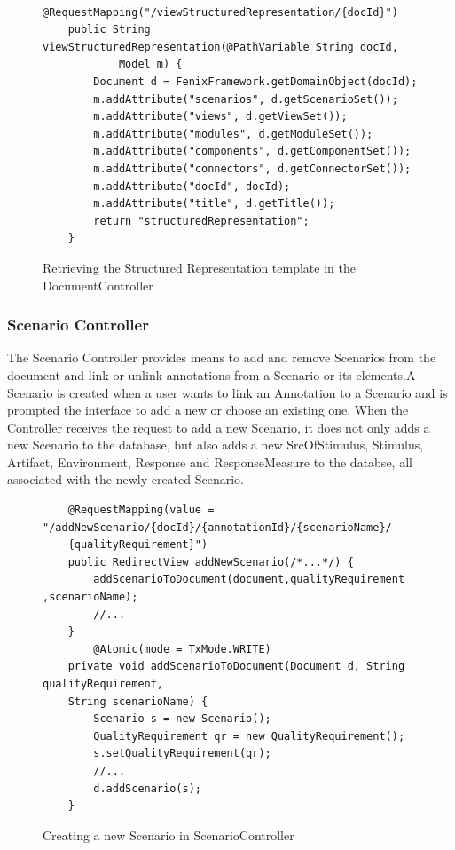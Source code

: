 \documentclass{llncs}
\begin{document}
\begin{itemize}
\begin{figure}
\lstset{style=customjava}
\begin{lstlisting}
	@RequestMapping("/viewStructuredRepresentation/{docId}")
	public String viewStructuredRepresentation(@PathVariable String docId,
			Model m) {
		Document d = FenixFramework.getDomainObject(docId);
		m.addAttribute("scenarios", d.getScenarioSet());
		m.addAttribute("views", d.getViewSet());
		m.addAttribute("modules", d.getModuleSet());
		m.addAttribute("components", d.getComponentSet());
		m.addAttribute("connectors", d.getConnectorSet());
		m.addAttribute("docId", docId);
		m.addAttribute("title", d.getTitle());
		return "structuredRepresentation";
	}
\end{lstlisting}
\caption{Retrieving the Structured Representation template in the DocumentController}
\label{figure:documentControllerStructuredRepresentation}
\end{figure}
\end{itemize}

\subsubsection{Scenario Controller}

The Scenario Controller provides means to add and remove Scenarios from the document and link or unlink annotations from a Scenario or its elements.A Scenario is created when a user wants to link an Annotation to a Scenario and is prompted the interface to add a new or choose an existing one. When the Controller receives the request to add a new Scenario, it does not only adds a new Scenario to the database, but also adds a new SrcOfStimulus, Stimulus, Artifact, Environment, Response and ResponseMeasure to the databse, all associated with the newly created Scenario. 

\begin{figure}
\lstset{style=customjava}
\begin{lstlisting}
	@RequestMapping(value = "/addNewScenario/{docId}/{annotationId}/{scenarioName}/
	{qualityRequirement}")
	public RedirectView addNewScenario(/*...*/) {
		addScenarioToDocument(document,qualityRequirement ,scenarioName);		
		//...
	}
		@Atomic(mode = TxMode.WRITE)
	private void addScenarioToDocument(Document d, String qualityRequirement, 
	String scenarioName) {
		Scenario s = new Scenario();
		QualityRequirement qr = new QualityRequirement();
		s.setQualityRequirement(qr);
		//...		
		d.addScenario(s);
	}	
\end{lstlisting}
\caption{Creating a new Scenario in ScenarioController}
\label{figure:scenarioControllerNewScenario}
\end{figure}
\end{document}
